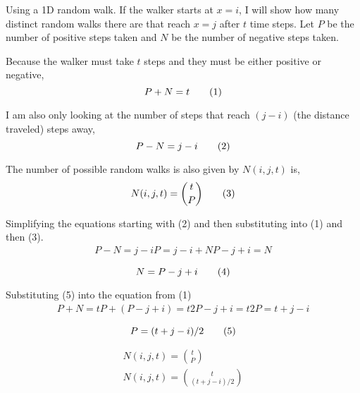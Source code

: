 Using a 1D random walk. If the walker starts at $x = i$, I will show how many distinct random walks there are that reach $x = j$ after $t$ time steps. Let $P$ be the number of positive steps taken and $N$ be the number of negative steps taken.

Because the walker must take $t$ steps and they must be either positive or negative,
\[
    P + N = t
    \addtag
\]

I am also only looking at the number of steps that reach $(j - i)$ (the distance traveled) steps away,
\[
    P - N = j - i 
    \addtag
\]

The number of possible random walks is also given by $N(i, j, t)$ is,
\[
    N(i, j, t) = 
        \binom{t}{P}
    \addtag
\]

Simplifying the equations starting with (2) and then substituting into (1) and then (3).
\begin{equation}
\begin{gathered}
    P - N = j - i
    P  = j - i + N
    P - j + i = N
\end{gathered}
\end{equation}

\[
    N = P - j + i
    \addtag
\]

Substituting (5) into the equation from (1)
\begin{equation}
\begin{gathered}
    P + N = t
    P + (P - j + i) = t
    2P - j + i = t
    2P = t + j - i
\end{gathered}
\end{equation}

\[
    P = (t + j - i) / 2
    \addtag
\]

\begin{equation}
\begin{gathered}
    N(i, j, t) =
        \binom{t}{P} \\
    N(i, j, t) =
        \binom{t}{(t + j - i) / 2}
\end{gathered}
\end{equation}